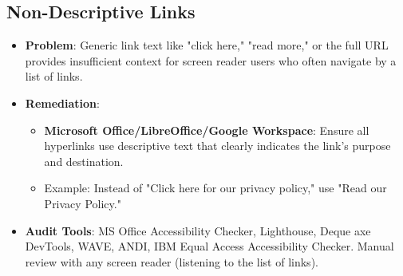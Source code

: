 \subsection{Non-Descriptive Links}
\begin{itemize}
    \item \textbf{Problem}: Generic link text like "click here," "read more," or the full URL provides insufficient context for screen reader users who often navigate by a list of links.
    \item \textbf{Remediation}:
        \begin{itemize}
            \item \textbf{Microsoft Office/LibreOffice/Google Workspace}: Ensure all hyperlinks use descriptive text that clearly indicates the link's purpose and destination.
            \item Example: Instead of "Click here for our privacy policy," use "Read our Privacy Policy."
        \end{itemize}
    \item \textbf{Audit Tools}: MS Office Accessibility Checker, Lighthouse, Deque axe DevTools, WAVE, ANDI, IBM Equal Access Accessibility Checker. Manual review with any screen reader (listening to the list of links).
\end{itemize}

